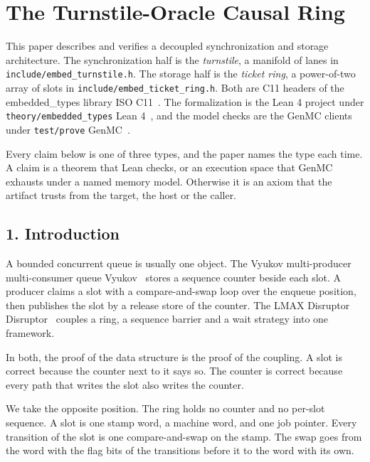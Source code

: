 \chapter{\texorpdfstring{The Turnstile-Oracle Causal Ring}{The Turnstile-Oracle Causal Ring}}
\label{chap:turnstile-ticket-ring}

This paper describes and verifies a decoupled synchronization and storage architecture. The synchronization half is the \emph{turnstile}, a manifold of lanes in \texttt{include/\allowbreak{}embed\_\allowbreak{}turnstile.\allowbreak{}h}. The storage half is the \emph{ticket ring}, a power-of-two array of slots in \texttt{include/\allowbreak{}embed\_\allowbreak{}ticket\_\allowbreak{}ring.\allowbreak{}h}. Both are C11 headers of the embedded\_\allowbreak{}types library ISO C11~\cite{src:ISO-C11}. The formalization is the Lean 4 project under \texttt{theory/\allowbreak{}embedded\_\allowbreak{}types} Lean 4~\cite{src:Lean4}, and the model checks are the GenMC clients under \texttt{test/\allowbreak{}prove} GenMC~\cite{src:GenMC}.

Every claim below is one of three types, and the paper names the type each time. A claim is a theorem that Lean checks, or an execution space that GenMC exhausts under a named memory model. Otherwise it is an axiom that the artifact trusts from the target, the host or the caller.

\section{\texorpdfstring{1. Introduction}{1. Introduction}}

A bounded concurrent queue is usually one object. The Vyukov multi-producer multi-consumer queue Vyukov~\cite{src:Vyukov} stores a sequence counter beside each slot. A producer claims a slot with a compare-and-swap loop over the enqueue position, then publishes the slot by a release store of the counter. The LMAX Disruptor Disruptor~\cite{src:Disruptor} couples a ring, a sequence barrier and a wait strategy into one framework.

In both, the proof of the data structure is the proof of the coupling. A slot is correct because the counter next to it says so. The counter is correct because every path that writes the slot also writes the counter.

We take the opposite position. The ring holds no counter and no per-slot sequence. A slot is one stamp word, a machine word, and one job pointer. Every transition of the slot is one compare-and-swap on the stamp. The swap goes from the word with the flag bits of the transitions before it to the word with its own.

